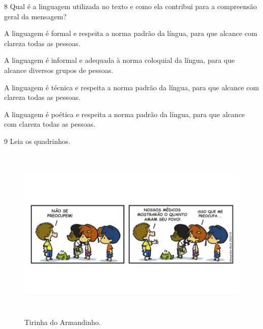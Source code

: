 \num{8} Qual é a linguagem utilizada no texto e como ela contribui para
a compreensão geral da mensagem?

\begin{escolha}
\item A linguagem é formal e respeita a norma padrão da língua, para que
alcance com clareza todas as pessoas.
\item A linguagem é informal e adequada à norma coloquial da língua, para
que alcance diversos grupos de pessoas.
\item A linguagem é técnica e respeita a norma padrão da língua, para que
alcance com clareza todas as pessoas.
\item A linguagem é poética e respeita a norma padrão da língua, para que
alcance com clareza todas as pessoas.
\end{escolha}






\num{9} Leia os quadrinhos. 

\begin{figure}[H]
\centering\includegraphics[width=5.90556in,height=3.32222in]{./imgSAEB_6_POR/media/image45.jpeg}
\caption{Tirinha do Armandinho.}
\end{figure}


